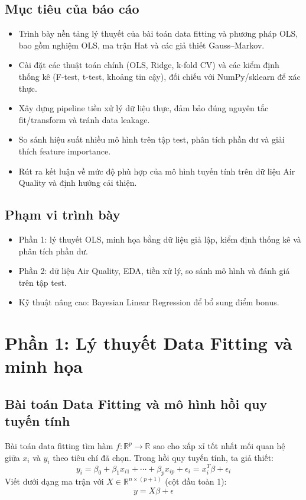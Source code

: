 \documentclass[a4paper]{article}
\begin{document}
\subsection{Mục tiêu của báo cáo}
\begin{itemize}
    \item Trình bày nền tảng lý thuyết của bài toán data fitting và phương pháp OLS, bao gồm nghiệm OLS, ma trận Hat và các giả thiết Gauss--Markov.
    \item Cài đặt các thuật toán chính (OLS, Ridge, k-fold CV) và các kiểm định thống kê (F-test, t-test, khoảng tin cậy), đối chiếu với NumPy/sklearn để xác thực.
    \item Xây dựng pipeline tiền xử lý dữ liệu thực, đảm bảo đúng nguyên tắc fit/transform và tránh data leakage.
    \item So sánh hiệu suất nhiều mô hình trên tập test, phân tích phần dư và giải thích feature importance.
    \item Rút ra kết luận về mức độ phù hợp của mô hình tuyến tính trên dữ liệu Air Quality và định hướng cải thiện.
\end{itemize}


\subsection{Phạm vi trình bày}
\begin{itemize}
    \item Phần 1: lý thuyết OLS, minh họa bằng dữ liệu giả lập, kiểm định thống kê và phân tích phần dư.
    \item Phần 2: dữ liệu Air Quality, EDA, tiền xử lý, so sánh mô hình và đánh giá trên tập test.
    \item Kỹ thuật nâng cao: Bayesian Linear Regression để bổ sung điểm bonus.
\end{itemize}

\section{Phần 1: Lý thuyết Data Fitting và minh họa}

\subsection{Bài toán Data Fitting và mô hình hồi quy tuyến tính}
Bài toán data fitting tìm hàm $f:\mathbb{R}^p \to \mathbb{R}$ sao cho xấp xỉ tốt nhất mối quan hệ giữa $x_i$ và $y_i$ theo tiêu chí đã chọn. Trong hồi quy tuyến tính, ta giả thiết:
\begin{equation}
y_i = \beta_0 + \beta_1 x_{i1} + \cdots + \beta_p x_{ip} + \epsilon_i = x_i^T\beta + \epsilon_i
\end{equation}
Viết dưới dạng ma trận với $X\in\mathbb{R}^{n\times (p+1)}$ (cột đầu toàn 1):
\begin{equation}
y = X\beta + \epsilon
\end{equation}
\end{document}
